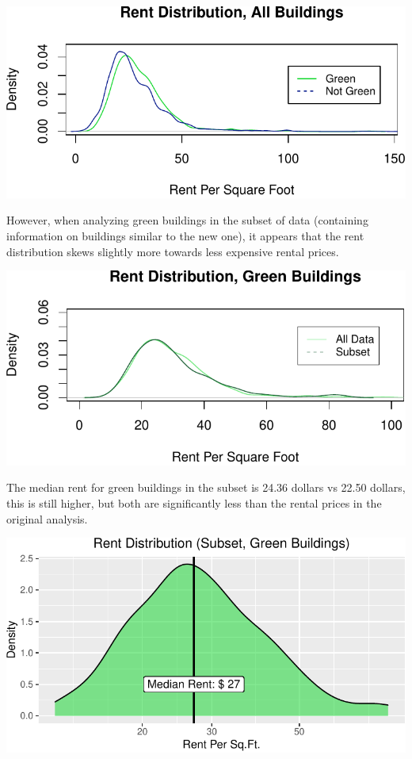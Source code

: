 \documentclass[
]{article}
\begin{document}
\begin{center}\includegraphics{STA380Exercises_Ofunrein_Pflum_Robinson_Vincent_files/figure-latex/unnamed-chunk-3-1} \end{center}

However, when analyzing green buildings in the subset of data
(containing information on buildings similar to the new one), it appears
that the rent distribution skews slightly more towards less expensive
rental prices.

\begin{center}\includegraphics{STA380Exercises_Ofunrein_Pflum_Robinson_Vincent_files/figure-latex/unnamed-chunk-4-1} \end{center}

The median rent for green buildings in the subset is 24.36 dollars vs
22.50 dollars, this is still higher, but both are significantly less
than the rental prices in the original analysis.

\begin{center}\includegraphics{STA380Exercises_Ofunrein_Pflum_Robinson_Vincent_files/figure-latex/unnamed-chunk-5-1} \end{center}
\end{document}
